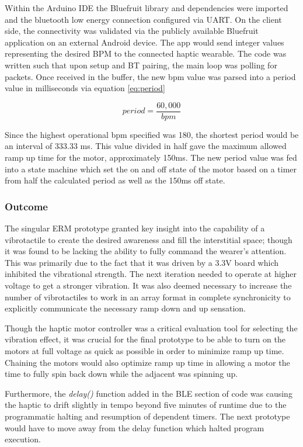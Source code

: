     Within the Arduino IDE the Bluefruit library and dependencies were imported and the bluetooth low energy connection configured via UART. On the client side, the connectivity was validated via the publicly available Bluefruit application on an external Android device. The app would send integer values representing the desired BPM to the connected haptic wearable. The code was written such that upon setup and BT pairing, the main loop was polling for packets. Once received in the buffer, the new bpm value was parsed into a period value in milliseconds via equation \ref{eq:period}

    \begin{equation}
        \label{eq:period}
        period = \frac{60,000}{bpm}
    \end{equation}

    Since the highest operational bpm specified was 180, the shortest period would be an interval of 333.33 ms. This value divided in half gave the maximum allowed ramp up time for the motor, approximately 150ms. The new period value was fed into a state machine which set the on and off state of the motor based on a timer from half the calculated period as well as the 150ms off state.

    \subsubsection{Outcome}
    The singular ERM prototype granted key insight into the capability of a vibrotactile to create the desired awareness and fill the interstitial space; though it was found to be lacking the ability to fully command the wearer's attention. This was primarily due to the fact that it was driven by a 3.3V board which inhibited the vibrational strength. The next iteration needed to operate at higher voltage to get a stronger vibration. It was also deemed necessary to increase the number of vibrotactiles to work in an array format in complete synchronicity to explicitly communicate the necessary ramp down and up sensation. 
    
    Though the haptic motor controller was a critical evaluation tool for selecting the vibration effect, it was crucial for the final prototype to be able to turn on the motors at full voltage as quick as possible in order to minimize ramp up time. Chaining the motors would also optimize ramp up time in allowing a motor the time to fully spin back down while the adjacent was spinning up.

    Furthermore, the \textit{delay()} function added in the BLE section of code was causing the haptic to drift slightly in tempo beyond five minutes of runtime due to the programmatic halting and resumption of dependent timers. The next prototype would have to move away from the delay function which halted program execution.

